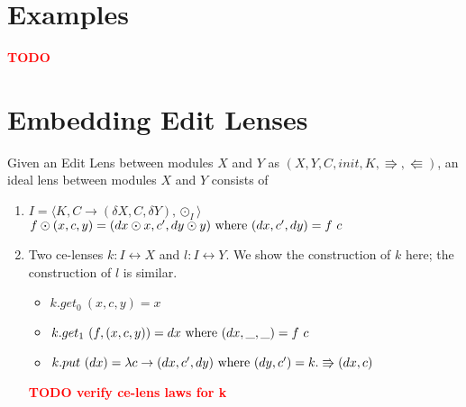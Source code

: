 \documentclass[a4paper,10pt]{article}
\newcommand{\finish}[1]{#1}
\newcommand{\comment}[1]{\finish{\textbf{\textcolor{red}{#1}}}}
\begin{document}
\section{Examples}
\comment{TODO}

\section{Embedding Edit Lenses}
Given an Edit Lens between modules $X$ and $Y$ as $(X,Y,C,init,K,\Rrightarrow,\Lleftarrow)$, an ideal lens between modules $X$ and $Y$ consists of
\begin{enumerate}

\item $I = \langle K, C \to (\delta X, C, \delta Y), \odot_I \rangle$ \\
      $f \odot (x, c, y) = (dx \odot x, c', dy \odot y) \textnormal{ where } (dx, c', dy) = f~c $ 
\item Two ce-lenses $k: I \leftrightarrow X$ and $l : I \leftrightarrow Y$. We show the construction of $k$ here; the construction of $l$ is similar.
  \begin{itemize}
   \item $k.get_0~(x,c,y) = x$
   \item $k.get_1~(f, (x,c,y)) = dx \textnormal{ where } (dx, \_, \_) = f~c$
   \item $k.put~(dx) = \lambda c \to (dx, c', dy) \textnormal{ where } (dy, c') = k.\Rrightarrow(dx, c)$
  \end{itemize}
  
\comment{TODO verify ce-lens laws for k}

\end{enumerate}
\end{document}
